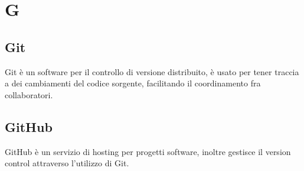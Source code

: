 \section{G}
\subsection{Git}%
Git è un software per il controllo di versione distribuito,  è usato per tener traccia a dei cambiamenti del codice sorgente, facilitando il coordinamento fra collaboratori.

\subsection{GitHub}%
GitHub è un servizio di hosting per progetti software,  inoltre gestisce il version control attraverso l'utilizzo di Git.
\clearpage